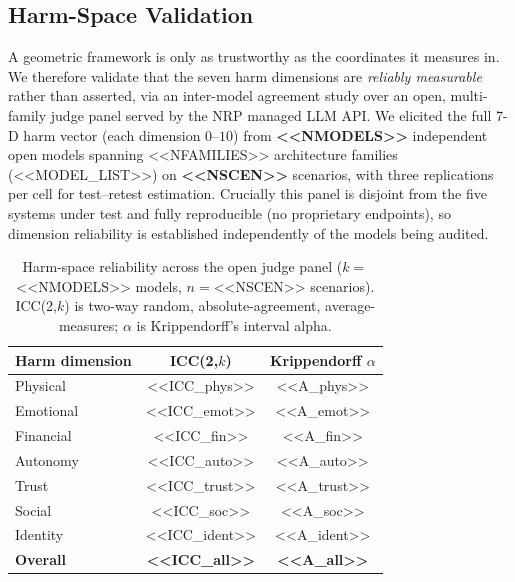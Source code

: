 

\subsection{Harm-Space Validation}
\label{sec:validation}

A geometric framework is only as trustworthy as the coordinates it measures in.
We therefore validate that the seven harm dimensions are \emph{reliably
measurable} rather than asserted, via an inter-model agreement study over an
open, multi-family judge panel served by the NRP managed LLM API. We elicited
the full 7-D harm vector (each dimension $0$--$10$) from \textbf{<<NMODELS>>}
independent open models spanning <<NFAMILIES>> architecture families
(<<MODEL_LIST>>) on \textbf{<<NSCEN>>} scenarios, with three replications per
cell for test--retest estimation. Crucially this panel is disjoint from the
five systems under test and fully reproducible (no proprietary endpoints),
so dimension reliability is established independently of the models being
audited.

\begin{table}[htbp]
\caption{Harm-space reliability across the open judge panel ($k=$<<NMODELS>> models, $n=$<<NSCEN>> scenarios). ICC(2,$k$) is two-way random, absolute-agreement, average-measures; $\alpha$ is Krippendorff's interval alpha.}
\label{tab:validation}
\centering
\footnotesize
\begin{tabular}{@{}lcc@{}}
\toprule
\textbf{Harm dimension} & \textbf{ICC(2,$k$)} & \textbf{Krippendorff $\alpha$} \\
\midrule
Physical    & <<ICC_phys>>  & <<A_phys>>  \\
Emotional   & <<ICC_emot>>  & <<A_emot>>  \\
Financial   & <<ICC_fin>>   & <<A_fin>>   \\
Autonomy    & <<ICC_auto>>  & <<A_auto>>  \\
Trust       & <<ICC_trust>> & <<A_trust>> \\
Social      & <<ICC_soc>>   & <<A_soc>>   \\
Identity    & <<ICC_ident>> & <<A_ident>> \\
\midrule
\textbf{Overall} & \textbf{<<ICC_all>>} & \textbf{<<A_all>>} \\
\bottomrule
\end{tabular}
\end{table}

